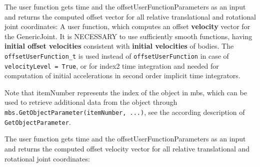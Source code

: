     The user function gets time and the offsetUserFunctionParameters as an input and returns the computed offset vector 
    for all relative translational and rotational joint coordinates:
    \finishTable
    A user function, which computes an offset {\bf velocity} vector for the GenericJoint.
    It is NECESSARY to use sufficiently smooth functions, having {\bf initial offset velocities} consistent with {\bf initial velocities} of bodies.
    The \texttt{offsetUserFunction\_t} is used instead of \texttt{offsetUserFunction} in case of \texttt{velocityLevel = True}, 
    or for index2 time integration and needed for computation of initial accelerations in second order implicit time integrators.

    Note that itemNumber represents the index of the object in mbs, which can be used to retrieve additional data from the object through
    \texttt{mbs.GetObjectParameter(itemNumber, ...)}, see the according description of \texttt{GetObjectParameter}.

    The user function gets time and the offsetUserFunctionParameters as an input and returns the computed offset velocity vector 
    for all relative translational and rotational joint coordinates:
    \finishTable


